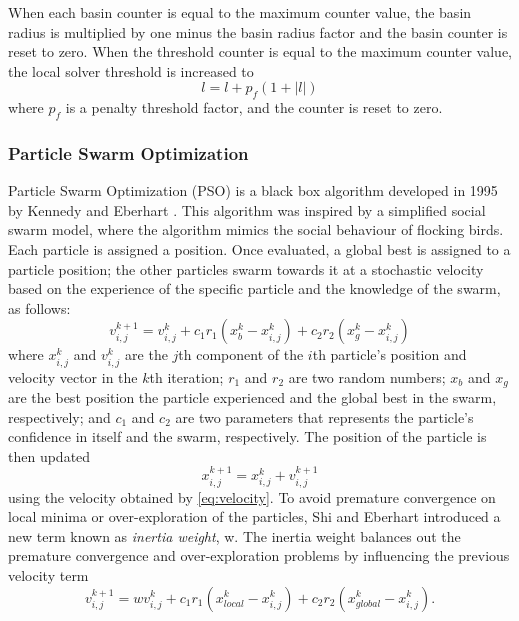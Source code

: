 When each basin counter is equal to the maximum counter value, the basin radius is multiplied by one minus the basin radius factor and the basin counter is reset to zero. When the threshold counter is equal to the maximum counter value, the local solver threshold is increased to
\begin{equation}
    l = l + p_f(1+|l|)
\end{equation}
where $p_f$ is a penalty threshold factor, and the counter is reset to zero.

\subsubsection{Particle Swarm Optimization}
Particle Swarm Optimization (PSO) is a black box algorithm developed in 1995 by Kennedy and Eberhart \cite{Kennedy1995}. This algorithm was inspired by a simplified social swarm model, where the algorithm mimics the social behaviour of flocking birds. Each particle is assigned a position. Once evaluated, a global best is assigned to a particle position; the other particles swarm towards it at a stochastic velocity based on the experience of the specific particle and the knowledge of the swarm, as follows: 
\begin{equation}
    \label{eq:velocity}
    v^{k+1}_{i,j} = v^{k}_{i,j} + c_1r_1(x^{k}_b - x^{k}_{i,j}) + c_2r_2(x^{k}_g - x^{k}_{i,j})
\end{equation}
where $x^k_{i,j}$ and $v^k_{i,j}$ are the $j$th component of the $i$th particle's position and velocity vector in the $k$th iteration; $r_1$ and $r_2$ are two random numbers; $x_b$ and $x_g$ are the best position the particle experienced and the global best in the swarm, respectively; and $c_1$ and $c_2$ are two parameters that represents the particle's confidence in itself and the swarm, respectively. The position of the particle is then updated
\begin{equation}
    \label{eq:position}
    x^{k+1}_{i,j} = x^k_{i,j} + v^{k+1}_{i,j}
\end{equation}
using the velocity obtained by \eqref{eq:velocity}. To avoid premature convergence on local minima or over-exploration of the particles, Shi and Eberhart \cite{Eberhart2000} introduced a new term known as \textit{inertia weight}, w. The inertia weight balances out the premature convergence and over-exploration problems by influencing the previous velocity term
\begin{equation}
    \label{eq:velocity2}
    v^{k+1}_{i,j} = wv^{k}_{i,j} + c_1r_1(x^{k}_{local} - x^{k}_{i,j}) + c_2r_2(x^{k}_{global} - x^{k}_{i,j}).
\end{equation}

